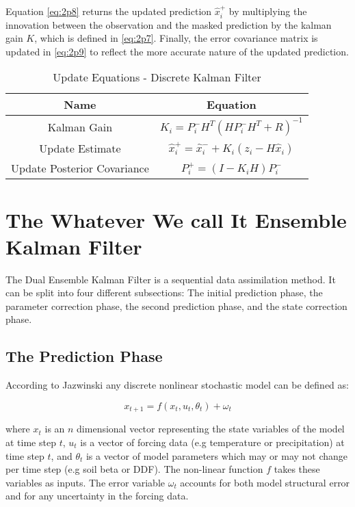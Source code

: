 Equation \eqref{eq:2p8} returns the updated prediction $\hat{x}^{+}_{i}$ by multiplying the innovation between the observation and the masked prediction by the kalman gain $K$, which is defined in \eqref{eq:2p7}. Finally, the error covariance matrix is updated in \eqref{eq:2p9} to reflect the more accurate nature of the updated prediction.

\begin{table}[h]
\caption{Update Equations - Discrete Kalman Filter} 
\centering
\begin{tabular}{c c}
\\ [0.1ex]
\hline
Name & Equation \\ [0.5ex]
\hline            
Kalman Gain & \parbox{3cm}{\begin{equation}\label{eq:2p7}K_{i} = P^{-}_{i}H^{T}(HP^{-}_{i}H^{T} + R)^{-1} \end{equation}} \\
Update Estimate & \parbox{3cm}{\begin{equation}\label{eq:2p8} \hat{x}^{+}_{i} = \hat{x}^{-}_{i} + K_{i}(z_{i}-H\hat{x}_{i}) \end{equation}} \\
Update Posterior Covariance & \parbox{3cm}{\begin{equation}\label{eq:2p9}P^{+}_{i} = (I-K_{i}H)P^{-}_{i} \end{equation}}
\end{tabular}
\label{tab:hresult}
\end{table}


\section{The Whatever We call It Ensemble Kalman Filter}

The Dual Ensemble Kalman Filter is a sequential data assimilation method. It can be split into four different subsections: The initial prediction phase, the parameter correction phase, the second prediction phase, and the state correction phase.

\subsection{The Prediction Phase}

According to Jazwinski \cite{Jazwinski1970} any discrete nonlinear stochastic model can be defined as:

\begin{equation}\label{eq:gen_stoc}
x_{t+1} = f(x_{t}, u_{t}, \theta_{t}) + \omega_{t}
\end{equation}

where $x_{t}$ is an $n$ dimensional vector representing the state variables of the model at time step $t$, $u_{t}$ is a vector of forcing data (e.g temperature or precipitation) at time step $t$, and $\theta_{t}$ is a vector of model parameters which may or may not change per time step (e.g soil beta or DDF). The non-linear function $f$ takes these variables as inputs. The error variable $\omega_{t}$ accounts for both model structural error and for any uncertainty in the forcing data. 



